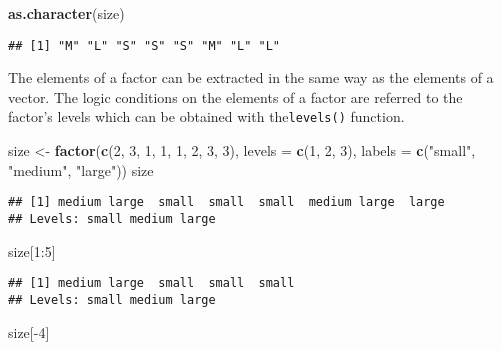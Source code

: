 \documentclass[]{book}
\newenvironment{Shaded}{\begin{snugshade}}{\end{snugshade}}
\newcommand{\KeywordTok}[1]{\textcolor[rgb]{0.13,0.29,0.53}{\textbf{{#1}}}}
\newcommand{\DataTypeTok}[1]{\textcolor[rgb]{0.13,0.29,0.53}{{#1}}}
\newcommand{\DecValTok}[1]{\textcolor[rgb]{0.00,0.00,0.81}{{#1}}}
\newcommand{\StringTok}[1]{\textcolor[rgb]{0.31,0.60,0.02}{{#1}}}
\newcommand{\NormalTok}[1]{{#1}}
\begin{document}
\begin{Shaded}
\begin{Highlighting}[]
\KeywordTok{as.character}\NormalTok{(size)}
\end{Highlighting}
\end{Shaded}

\begin{verbatim}
## [1] "M" "L" "S" "S" "S" "M" "L" "L"
\end{verbatim}

The elements of a factor can be extracted in the same way as the
elements of a vector. The logic conditions on the elements of a factor
are referred to the factor's levels which can be obtained with
the\texttt{levels()} function.

\begin{Shaded}
\begin{Highlighting}[]
\NormalTok{size <-}\StringTok{ }\KeywordTok{factor}\NormalTok{(}\KeywordTok{c}\NormalTok{(}\DecValTok{2}\NormalTok{, }\DecValTok{3}\NormalTok{, }\DecValTok{1}\NormalTok{, }\DecValTok{1}\NormalTok{, }\DecValTok{1}\NormalTok{, }\DecValTok{2}\NormalTok{, }\DecValTok{3}\NormalTok{, }\DecValTok{3}\NormalTok{), }\DataTypeTok{levels =} \KeywordTok{c}\NormalTok{(}\DecValTok{1}\NormalTok{, }\DecValTok{2}\NormalTok{, }\DecValTok{3}\NormalTok{),}
  \DataTypeTok{labels =} \KeywordTok{c}\NormalTok{(}\StringTok{"small"}\NormalTok{, }\StringTok{"medium"}\NormalTok{, }\StringTok{"large"}\NormalTok{))}
\NormalTok{size}
\end{Highlighting}
\end{Shaded}

\begin{verbatim}
## [1] medium large  small  small  small  medium large  large 
## Levels: small medium large
\end{verbatim}

\begin{Shaded}
\begin{Highlighting}[]
\NormalTok{size[}\DecValTok{1}\NormalTok{:}\DecValTok{5}\NormalTok{]}
\end{Highlighting}
\end{Shaded}

\begin{verbatim}
## [1] medium large  small  small  small 
## Levels: small medium large
\end{verbatim}

\begin{Shaded}
\begin{Highlighting}[]
\NormalTok{size[-}\DecValTok{4}\NormalTok{]}
\end{Highlighting}
\end{Shaded}
\end{document}
